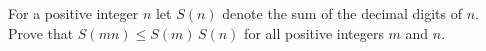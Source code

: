 For a positive integer $n$ let $S(n)$ denote the sum of the decimal digits of $n$. Prove that $S(mn)\le S(m)\,S(n)$ for all positive integers $m$ and $n$.
